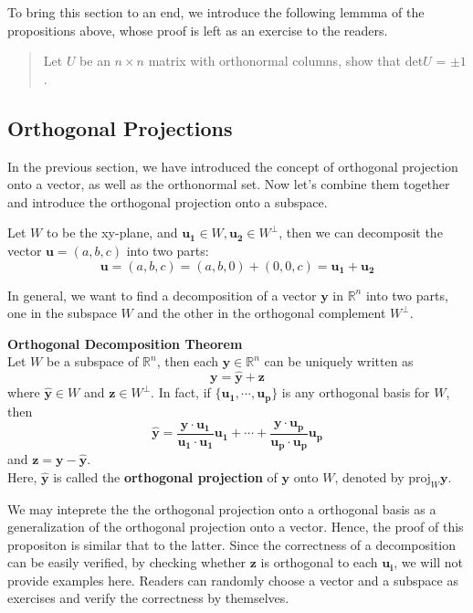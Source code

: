 \documentclass[10pt, a4paper]{article}
\newcommand{\R}{\mathbb{R}}
\newcommand{\vt}[1]{\mathbf{#1}}
\begin{document}
\indent To bring this section to an end, we introduce the following lemmma of the propositions above, whose proof is left as an exercise to the readers.
\begin{quotation}
    Let $U$ be an $n\times n$ matrix with orthonormal columns, show that det$U$ = $\pm 1$.
\end{quotation}

\subsection{Orthogonal Projections}
\indent In the previous section, we have introduced the concept of orthogonal projection onto a vector, as well as the orthonormal set. Now let's combine them together and introduce the orthogonal projection onto a subspace.
\begin{example}
    Let $W$ to be the xy-plane, and $\vt{u_1}\in W,\vt{u_2}\in W^\perp$, then we can decomposit the vector $\vt{u}=(a,b,c)$ into two parts:\[
    \vt{u}=(a,b,c)=(a,b,0)+(0,0,c)=\vt{u_1}+\vt{u_2}
    \]
\end{example}
In general, we want to find a decomposition of a vector $\vt{y}$ in $\R^n$ into two parts, one in the subspace $W$ and the other in the orthogonal complement $W^\perp$.
\begin{proposition}
    \textbf{Orthogonal Decomposition Theorem}\\
     Let $W$ be a subspace of $\R^n$, then each $\vt{y}\in\R^n$ can be uniquely written as\[
    \vt{y} = \hat{\vt{y}} + \vt{z}
    \]
    where $\hat{\vt{y}}\in W$ and $\vt{z}\in W^\perp$. In fact, if $\{\vt{u_1},\cdots,\vt{u_p}\}$ is any orthogonal basis for $W$, then\[
    \hat{\vt{y}} = \frac{\vt{y}\cdot\vt{u_1}}{\vt{u_1}\cdot\vt{u_1}}\vt{u_1}+\cdots+\frac{\vt{y}\cdot\vt{u_p}}{\vt{u_p}\cdot\vt{u_p}}\vt{u_p}
    \]
    and $\vt{z} = \vt{y} - \hat{\vt{y}}$.\\
    Here, $\hat{\vt{y}}$ is called the \textbf{orthogonal projection} of $\vt{y}$ onto $W$, denoted by $\text{proj}_W\vt{y}$.
\end{proposition}
\indent We may inteprete the the orthogonal projection onto a orthogonal basis as a generalization of the orthogonal projection onto a vector. Hence, the proof of this propositon is similar that to the latter. 
Since the correctness of a decomposition can be easily verified, by checking whether $\vt{z}$ is orthogonal to each $\vt{u_i}$, we will not provide examples here. Readers can randomly choose a vector and a subspace as exercises and verify the correctness by themselves.\\
\end{document}
